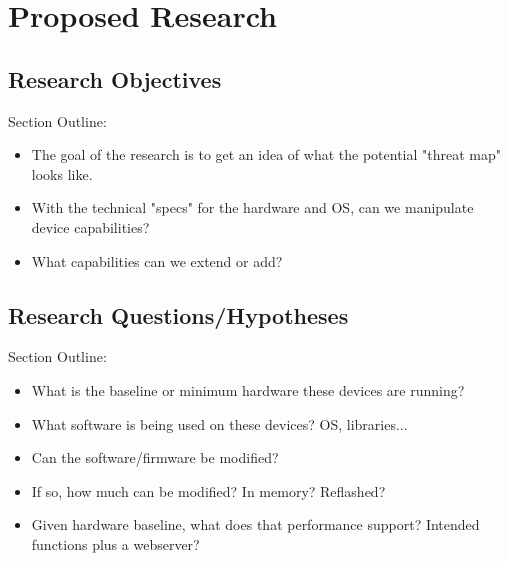 \chapter{\leavevmode Proposed Research}
\label{chap:proposedresearch}

\section{Research Objectives }
Section Outline:
\begin{itemize}
  \item The goal of the research is to get an idea of what the potential "threat map" looks like.
  \item With the technical "specs" for the hardware and OS, can we manipulate device capabilities?
  \item What capabilities can we extend or add?
\end{itemize}

\section{Research Questions/Hypotheses}
Section Outline:
\begin{itemize}
  \item What is the baseline or minimum hardware these devices are running?
  \item What software is being used on these devices? OS, libraries...
  \item Can the software/firmware be modified?
  \item If so, how much can be modified? In memory? Reflashed?
  \item Given hardware baseline, what does that performance support? Intended functions plus a webserver?
\end{itemize}

